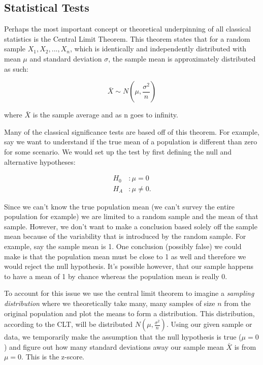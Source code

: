 \subsection{Statistical Tests}

Perhaps the most important concept or theoretical underpinning of all classical statistics is the Central Limit Theorem. This theorem states that for a random sample $X_1, X_2, ..., X_n$, which is identically and independently distributed with mean $\mu$ and standard deviation $\sigma$, the sample mean is approximately distributed as such:

\begin{equation}
\bar{X} \sim N(\mu, \frac{\sigma^2}{n})
\end{equation}

\noindent where $\bar{X}$ is the sample average and as n goes to infinity.

Many of the classical significance tests are based off of this theorem. For example, say we want to understand if the true mean of a population is different than zero for some scenario. We would set up the test by first defining the null and alternative hypotheses:

\begin{equation}
\begin{split}
H_0 &: \mu = 0 \\
H_A &:  \mu \neq 0.
\end{split}
\end{equation}

\noindent Since we can't know the true population mean (we can't survey the entire population for example) we are limited to a random sample and the mean of that sample. However, we don't want to make a conclusion based solely off the sample mean because of the variability that is introduced by the random sample. For example, say the sample mean is 1. One conclusion (possibly false) we could make is that the population mean must be close to 1 as well and therefore we would reject the null hypothesis. It's possible however, that our sample happens to have a mean of 1 by chance whereas the population mean is really 0.

To account for this issue we use the central limit theorem to imagine a \emph{sampling distribution} where we theoretically take many, many samples of size $n$ from the original population and plot the means to form a distribution. This distribution, according to the CLT, will be distributed $N(\mu, \frac{\sigma^2}{n})$. Using our given sample or data, we temporarily make the assumption that the null hypothesis is true ($\mu=0$) and figure out how many standard deviations away our sample mean $\bar{X}$ is from $\mu=0$. This is the z-score.

